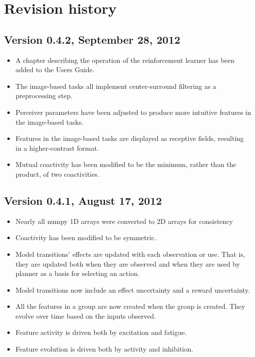 \chapter{Revision history}

\section{Version 0.4.2, September 28, 2012}

\begin{itemize}
\item A chapter describing the operation of the reinforcement learner has been added to the Users Guide.
\item The image-based tasks all implement center-surround filtering as a preprocessing step.
\item Perceiver parameters have been adjusted to produce more intuitive features in the image-based tasks.
\item Features in the image-based tasks are displayed as receptive fields, resulting in a higher-contrast format.
\item Mutual coactivity has been modified to be the minimum, rather than the product, of two coactivities.
\end{itemize}


\section{Version 0.4.1, August 17, 2012}

\begin{itemize}
\item Nearly all numpy 1D arrays were converted to 2D arrays for consistency   
\item Coactivity has been modified to be symmetric.
\item Model transitions' effects are updated with each observation or use. That is, they are updated both when they are observed and when they are used by planner as a basis for selecting an action.
\item Model transitions now include an effect uncertainty and a reward uncertainty. 
\item All the features in a group are now created when the group is created. They evolve over time based on the inputs observed.
\item Feature activity is driven both by excitation and fatigue.
\item Feature evolution is driven both by activity and inhibition.
\end{itemize}


